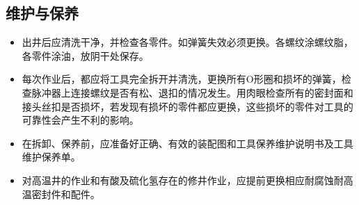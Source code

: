 \subsection{维护与保养}
\begin{itemize}
	\item 	出井后应清洗干净，并检查各零件。如弹簧失效必须更换。各螺纹涂螺纹脂，各零件涂油，放阴干处保存。
\item 	 每次作业后，都应将工具完全拆开并清洗，更换所有O形圈和损坏的弹簧，检查脉冲器上连接螺纹是否有松、退扣的情况发生。用肉眼检查所有的密封面和接头丝扣是否损坏，若发现有损坏的零件都应更换，这些损坏的零件对工具的可靠性会产生不利的影响。
\item 	在拆卸、保养前，应准备好正确、有效的装配图和工具保养维护说明书及工具维护保养单。
\item 	对高温井的作业和有酸及硫化氢存在的修井作业，应提前更换相应耐腐蚀耐高温密封件和配件。
\end{itemize}

















